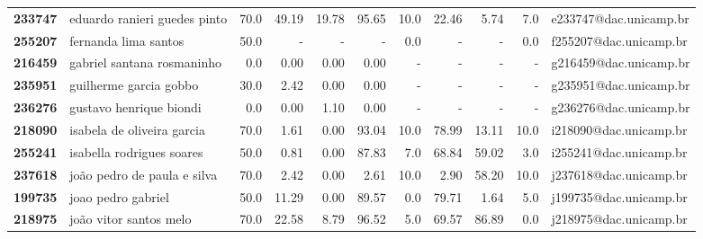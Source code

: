 \documentclass[11pt]{article}
\begin{document}
\begin{center}
\begin{landscape}
\begin{longtable}{llrrrrrrrrl}
\textbf{233747} &          eduardo ranieri guedes pinto &                  70.0 &       49.19 &       19.78 &       95.65 &                     10.0 &       22.46 &        5.74 &                        7.0 &  e233747@dac.unicamp.br \\
\textbf{255207} &                  fernanda lima santos &                  50.0 &           - &           - &           - &                      0.0 &           - &           - &                        0.0 &  f255207@dac.unicamp.br \\
\textbf{216459} &            gabriel santana rosmaninho &                   0.0 &        0.00 &        0.00 &        0.00 &                        - &           - &           - &                          - &  g216459@dac.unicamp.br \\
\textbf{235951} &                guilherme garcia gobbo &                  30.0 &        2.42 &        0.00 &        0.00 &                        - &           - &           - &                          - &  g235951@dac.unicamp.br \\
\textbf{236276} &               gustavo henrique biondi &                   0.0 &        0.00 &        1.10 &        0.00 &                        - &           - &           - &                          - &  g236276@dac.unicamp.br \\
\textbf{218090} &            isabela de oliveira garcia &                  70.0 &        1.61 &        0.00 &       93.04 &                     10.0 &       78.99 &       13.11 &                       10.0 &  i218090@dac.unicamp.br \\
\textbf{255241} &             isabella rodrigues soares &                  50.0 &        0.81 &        0.00 &       87.83 &                      7.0 &       68.84 &       59.02 &                        3.0 &  i255241@dac.unicamp.br \\
\textbf{237618} &           joão pedro de paula e silva &                  70.0 &        2.42 &        0.00 &        2.61 &                     10.0 &        2.90 &       58.20 &                       10.0 &  j237618@dac.unicamp.br \\
\textbf{199735} &                    joao pedro gabriel &                  50.0 &       11.29 &        0.00 &       89.57 &                      0.0 &       79.71 &        1.64 &                        5.0 &  j199735@dac.unicamp.br \\
\textbf{218975} &                joão vitor santos melo &                  70.0 &       22.58 &        8.79 &       96.52 &                      5.0 &       69.57 &       86.89 &                        0.0 &  j218975@dac.unicamp.br \\

\end{longtable}
\end{landscape}
\end{center}
\end{document}
